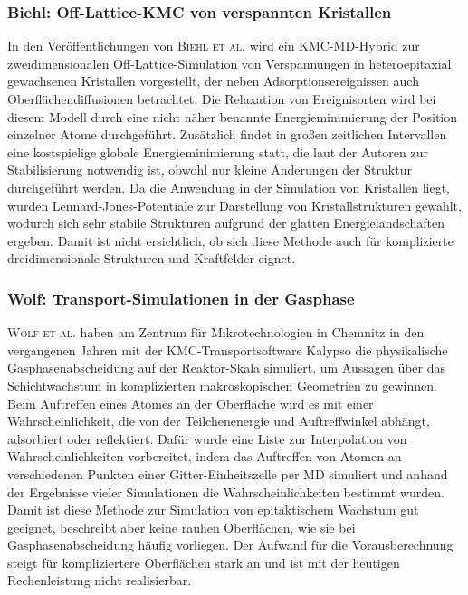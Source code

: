\subsubsection{Biehl: Off-Lattice-KMC von verspannten Kristallen}
In den Veröffentlichungen von \textsc{Biehl et al.}\cite{biehl_off-lattice_2005} wird ein KMC-MD-Hybrid zur zweidimensionalen Off-Lattice-Simulation von Verspannungen in heteroepitaxial gewachsenen Kristallen vorgestellt, der neben Adsorptionsereignissen auch Oberflächendiffusionen betrachtet.
Die Relaxation von Ereignisorten wird bei diesem Modell durch eine nicht näher benannte Energieminimierung der Position einzelner Atome durchgeführt.
Zusätzlich findet in großen zeitlichen Intervallen eine kostspielige globale Energieminimierung statt, die laut der Autoren zur Stabilisierung notwendig ist, obwohl nur kleine Änderungen der Struktur durchgeführt werden.
Da die Anwendung in der Simulation von Kristallen liegt, wurden Lennard-Jones-Potentiale zur Darstellung von Kristallstrukturen gewählt, wodurch sich sehr stabile Strukturen aufgrund der glatten Energielandschaften ergeben.
Damit ist nicht ersichtlich, ob sich diese Methode auch für komplizierte dreidimensionale Strukturen und Kraftfelder eignet.

\subsubsection{Wolf: Transport-Simulationen in der Gasphase}

\textsc{Wolf et al.}\cite{wolf_investigation_2002,wolf_simulation_2010} haben am Zentrum für Mikrotechnologien in Chemnitz in den vergangenen Jahren mit der KMC-Transportsoftware Kalypso\cite{karolewski_kalypso:_2005} die physikalische Gasphasenabscheidung auf der Reaktor-Skala simuliert, um Aussagen über das Schichtwachstum in komplizierten makroskopischen Geometrien zu gewinnen.
Beim Auftreffen eines Atomes an der Oberfläche wird es mit einer Wahrscheinlichkeit, die von der Teilchenenergie und Auftreffwinkel abhängt, adsorbiert oder reflektiert.
Dafür wurde eine Liste zur Interpolation von Wahrscheinlichkeiten vorbereitet, indem das Auftreffen von Atomen an verschiedenen Punkten einer Gitter-Einheitszelle per MD simuliert und anhand der Ergebnisse vieler Simulationen die Wahrscheinlichkeiten bestimmt wurden.
Damit ist diese Methode zur Simulation von epitaktischem Wachstum gut geeignet, beschreibt aber keine rauhen Oberflächen, wie sie bei Gasphasenabscheidung häufig vorliegen.
Der Aufwand für die Vorausberechnung steigt für kompliziertere Oberflächen stark an und ist mit der heutigen Rechenleistung nicht realisierbar.

